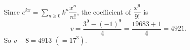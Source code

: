 Since $e^{kx}=\displaystyle\sum_{n\ge0}k^n\dfrac{x^n}{n!}$, the coefficient of $\dfrac{x^9}{9!}$ is
\[v=\dfrac{3^9-(-1)^9}{4}=\dfrac{19683+1}{4}=4921.\]
So $v-8=\boxed{4913}$ $(=17^3)$.
